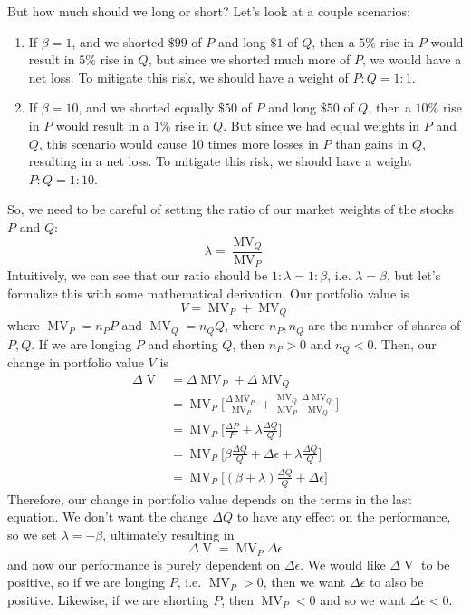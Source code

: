 \documentclass{article}
\DeclareMathOperator{\MV}{MV}
\DeclareMathOperator{\V}{V}
\begin{document}
    But how much should we long or short? Let's look at a couple scenarios: 
    \begin{enumerate}
        \item If $\beta = 1$, and we shorted $\$99$ of $P$ and long $\$1$ of $Q$, then a $5\%$ rise in $P$ would result in $5\%$ rise in $Q$, but since we shorted much more of $P$, we would have a net loss. To mitigate this risk, we should have a weight of $P:Q = 1:1$. 
        \item If $\beta = 10$, and we shorted equally $\$50$ of $P$ and long $\$50$ of $Q$, then a $10\%$ rise in $P$ would result in a $1\%$ rise in $Q$. But since we had equal weights in $P$ and $Q$, this scenario would cause 10 times more losses in $P$ than gains in $Q$, resulting in a net loss. To mitigate this risk, we should have a weight $P:Q = 1:10$. 
    \end{enumerate}
    So, we need to be careful of setting the ratio of our market weights of the stocks $P$ and $Q$: 
    \begin{equation}
      \lambda = \frac{\MV_Q}{\MV_P}
    \end{equation}
    Intuitively, we can see that our ratio should be $1: \lambda = 1:\beta$, i.e. $\lambda = \beta$, but let's formalize this with some mathematical derivation. Our portfolio value is 
    \begin{equation}
      V = \MV_P + \MV_Q
    \end{equation}
    where $\MV_P = n_P P$ and $\MV_Q = n_Q Q$, where $n_P, n_Q$ are the number of shares of $P, Q$. If we are longing $P$ and shorting $Q$, then $n_P > 0$ and $n_Q < 0$. Then, our change in portfolio value $V$ is 
    \begin{align*}
        \Delta \V & = \Delta \MV_P + \Delta \MV_Q \\
        & = \MV_P \bigg[\frac{\Delta \MV_P}{\MV_P} + \frac{\MV_Q}{\MV_P} \frac{\Delta \MV_Q}{\MV_Q}  \bigg] \\
        & = \MV_P \bigg[ \frac{\Delta P}{P} + \lambda \frac{\Delta Q}{Q} \bigg] \\
        & = \MV_P \bigg[ \beta \frac{\Delta Q}{Q} + \Delta \epsilon + \lambda \frac{\Delta Q}{Q} \bigg] \\
        & = \MV_P \bigg[ (\beta + \lambda) \frac{\Delta Q}{Q} + \Delta \epsilon \bigg] 
    \end{align*}
    Therefore, our change in portfolio value depends on the terms in the last equation. We don't want the change $\Delta Q$ to have any effect on the performance, so we set $\lambda = - \beta$, ultimately resulting in 
    \begin{equation}
      \Delta \V = \MV_P \Delta \epsilon
    \end{equation}
    and now our performance is purely dependent on $\Delta \epsilon$. We would like $\Delta \V$ to be positive, so if we are longing $P$, i.e. $\MV_P > 0$, then we want $\Delta \epsilon$ to also be positive. Likewise, if we are shorting $P$, then $\MV_P < 0$ and so we want $\Delta \epsilon < 0$. 
\end{document}
